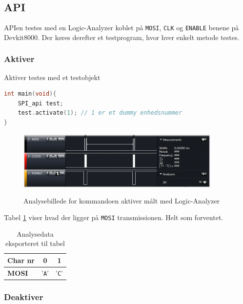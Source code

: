 
\subsection{API}

APIen testes med en Logic-Analyzer koblet på \verb+MOSI+, \verb+CLK+ og \verb+ENABLE+ benene på Devkit8000. Der køres derefter et testprogram, hvor hver enkelt metode testes.


\subsubsection*{Aktiver}

Aktiver testes med et testobjekt

\begin{lstlisting}[language=C]
int main(void){
	SPI_api test;
	test.activate(1); // 1 er et dummy enhedsnummer
}
\end{lstlisting}

\begin{figure}[H]
\centering
{\includegraphics[width=0.90\textwidth]{filer/modultest/Billeder/mt_activate}}
\caption{Analysebillede for kommandoen aktiver målt med Logic-Analyzer}
\label{lab:mt_activate}
\end{figure}

Tabel \ref{table:mt_activate} viser hvad der ligger på \verb+MOSI+ transmissionen. Helt som forventet.

\begin{table}[H]
	\caption{Analysedata eksporteret til tabel}
	\centering
	\begin{tabular}{|l|c|c|}
		\hline 
		\textbf{Char nr} & \textbf{0} & \textbf{1} \\ 		
		\hline 
		\textbf{MOSI} & '\verb+A+' & '\verb+C+' \\ 
		\hline 
	\end{tabular} 
	\label{table:mt_activate}
\end{table}


\subsubsection*{Deaktiver}

